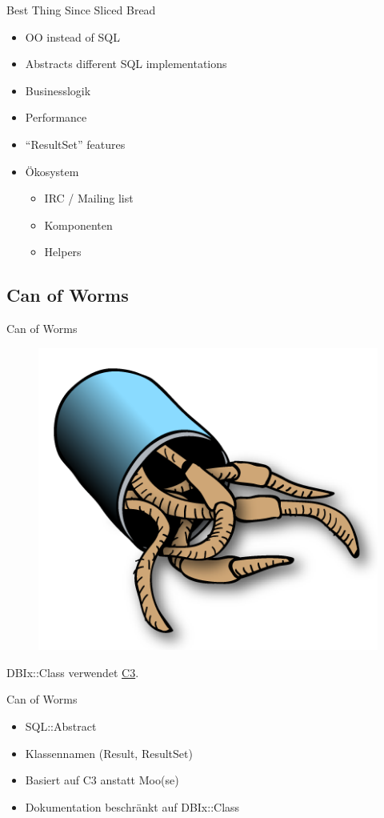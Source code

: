 \begin{frame}{Best Thing Since Sliced Bread}
\begin{itemize}
\item OO instead of SQL
\item Abstracts different SQL implementations
\item Businesslogik
\item Performance
\item ``ResultSet'' features
\item Ökosystem
\begin{itemize}
\item IRC / Mailing list
\item Komponenten
\item Helpers
\end{itemize}
\end{itemize}
\end{frame}

\subsection{Can of Worms}

\begin{frame}{Can of Worms}
\begin{figure}[!ht]
\centering
\includegraphics[width=0.75\linewidth]{img/canofworms.png}
\end{figure}
\end{frame}

DBIx::Class verwendet
\href{https://metacpan.org/pod/Class::C3::Componentised}{C3}.

\begin{frame}{Can of Worms}

\begin{itemize}
\item SQL::Abstract
\item Klassennamen (Result, ResultSet)
\item Basiert auf C3 anstatt Moo(se)
\item Dokumentation beschränkt auf DBIx::Class
\end{itemize}
\end{frame}

